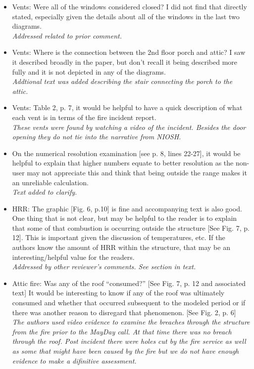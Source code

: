 \documentclass[12pt]{article}
\begin{document}
\begin{itemize}
{\it You are correct in that there were roof ventilation holes that were made. Roof ventilation occured after the interior flow path was established and was not considered in the model.}
\item Vents: Were all of the windows considered closed? I did not find that directly stated, especially given the details about all of the windows in the last two diagrams. \\
{\it Addressed related to prior comment.}
\item Vents: Where is the connection between the 2nd floor porch and attic? I saw it described broadly in the paper, but don't recall it being described more fully and it is not depicted in any of the diagrams. \\
{\it Addtional text was added describing the stair connecting the porch to the attic.}
\item Vents: Table 2, p. 7, it would be helpful to have a quick description of what each vent is in terms of the fire incident report. \\
{\it These vents were found by watching a video of the incident. Besides the door opening they do not tie into the narrative from NIOSH.}
\item On the numerical resolution examination [see p. 8, lines 22-27], it would be helpful to explain that higher numbers equate to better resolution as the non-user may not appreciate this and think that being outside the range makes it an unreliable calculation. \\
{\it Text added to clarify.}
\item HRR: The graphic [Fig. 6, p.10] is fine and accompanying text is also good. One thing that is not clear, but may be helpful to the reader is to explain that some of that combustion is occurring outside the structure [See Fig. 7, p. 12]. This is important given the discussion of temperatures, etc. If the authors know the amount of HRR within the structure, that may be an interesting/helpful value for the readers. \\
{\it Addressed by other reviewer's comments. See section in text.}
\item Attic fire: Was any of the roof ``consumed?'' [See Fig. 7, p. 12 and associated text] It would be interesting to know if any of the roof was ultimately consumed and whether that occurred subsequent to the modeled period or if there was another reason to disregard that phenomenon. [See Fig. 2, p. 6]\\
{\it The authors used video evidence to examine the breaches through the structure from the fire prior to the MayDay call. At that time there was no breach through the roof. Post incident there were holes cut by the fire service as well as some that might have been caused by the fire but we do not have enough evidence to make a difinitive assessment.}

\end{itemize}
\end{document}
